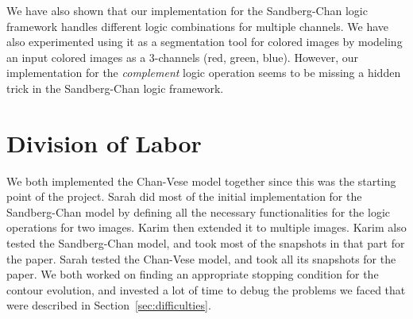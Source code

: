 \documentclass[10pt,twocolumn,letterpaper]{article}
\begin{document}
We have also shown that our implementation for the Sandberg-Chan logic framework handles different logic combinations for multiple channels. We have also
experimented using it as a segmentation tool for colored images by modeling an input colored images as a 3-channels (red, green, blue). However, our
implementation for the \textit{complement} logic operation seems to be missing a hidden trick in the Sandberg-Chan logic framework.






\appendix
\appendixpage

\section{Division of Labor}

We both implemented the Chan-Vese model together since this was the starting point of the project. Sarah did most of the initial implementation for the
Sandberg-Chan model by defining all the necessary functionalities for the logic operations for two images. Karim then extended it to multiple images. Karim
also tested the Sandberg-Chan model, and took most of the snapshots in that part for the paper. Sarah tested the Chan-Vese model, and took all its snapshots
for the paper. We both worked on finding an appropriate stopping condition for the contour evolution, and invested a lot of time to debug the problems we
faced that were described in Section~\ref{sec:difficulties}.



\end{document}

